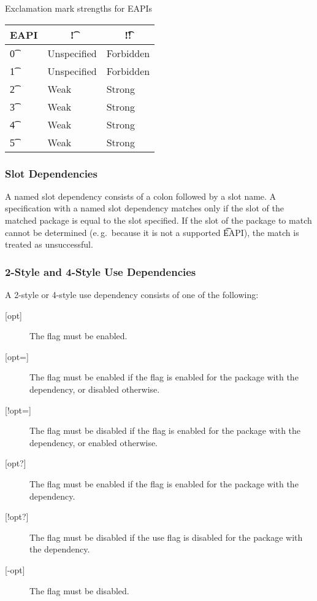 \begin{centertable}{Exclamation mark strengths for EAPIs} \label{tab:bang-strength-table}
    \begin{tabular}{ l l l }
        \toprule
            \multicolumn{1}{c}{\textbf{EAPI}} &
            \multicolumn{1}{c}{\textbf{\t{!}}} &
            \multicolumn{1}{c}{\textbf{\t{!!}}} \\
            \midrule
    \t{0} & Unspecified & Forbidden \\
    \t{1} & Unspecified & Forbidden \\
    \t{2} & Weak & Strong \\
    \t{3} & Weak & Strong \\
    \t{4} & Weak & Strong \\
    \t{5} & Weak & Strong \\
    \bottomrule
    \end{tabular}
\end{centertable}

\subsubsection{Slot Dependencies}
\label{sec:slot-dep}

 A named slot dependency consists of a colon followed by a slot name. A
specification with a named slot dependency matches only if the slot of the matched package is equal
to the slot specified. If the slot of the package to match cannot be determined (e.\,g.\ because it
is not a supported \t{EAPI}), the match is treated as unsuccessful.

\subsubsection{2-Style and 4-Style Use Dependencies}
\label{sec:use-dep}

A 2-style or 4-style use dependency consists of one of the following:

\begin{description}
\item[{[opt]}] The flag must be enabled.
\item[{[opt=]}] The flag must be enabled if the flag is enabled for the package with the
    dependency, or disabled otherwise.
\item[{[!opt=]}] The flag must be disabled if the flag is enabled for the package with the
    dependency, or enabled otherwise.
\item[{[opt?]}] The flag must be enabled if the flag is enabled for the package with the
    dependency.
\item[{[!opt?]}] The flag must be disabled if the use flag is disabled for the package with the
    dependency.
\item[{[-opt]}] The flag must be disabled.
\end{description}

